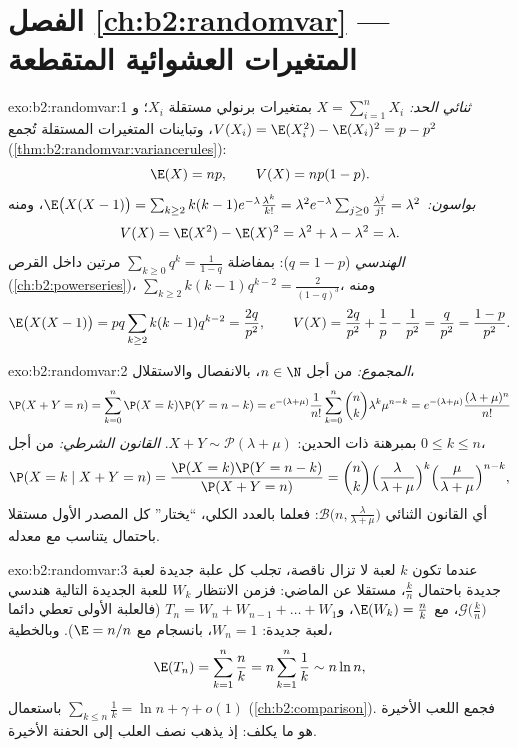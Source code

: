 \section*{الفصل \ref{ch:b2:randomvar} --- المتغيرات العشوائية المتقطعة}

\begin{solution}{exo:b2:randomvar:1}
\emph{ثنائي الحد:} $X = \sum_{i=1}^n X_i$ بمتغيرات برنولي مستقلة $X_i$؛ و$V(X_i) = \E(X_i^2) - \E(X_i)^2 = p - p^2$،
وتباينات المتغيرات المستقلة تُجمع (\cref{thm:b2:randomvar:variancerules}):
\[
\E(X) = np, \qquad V(X) = np(1-p) .
\]
\emph{بواسون:} $\E\bigl(X(X-1)\bigr) =
\sum_{k\geq2}k(k-1)e^{-\lambda}\frac{\lambda^k}{k!} = \lambda^2
e^{-\lambda}\sum_{j\geq0}\frac{\lambda^j}{j!} = \lambda^2$، ومنه
\[
V(X) = \E(X^2) - \E(X)^2
= \lambda^2 + \lambda - \lambda^2 = \lambda .
\]
\emph{الهندسي} ($q = 1 - p$): بمفاضلة $\sum_{k\geq0}q^k = \frac{1}{1-q}$ مرتين داخل القرص (\cref{ch:b2:powerseries})،
$\sum_{k\geq2}k(k-1)q^{k-2} =
\frac{2}{(1-q)^3}$، ومنه
\[
\E\bigl(X(X-1)\bigr) = pq\sum_{k\geq2}k(k-1)q^{k-2}
= \frac{2q}{p^2},
\qquad
V(X) = \frac{2q}{p^2} + \frac1p - \frac{1}{p^2}
= \frac{q}{p^2} = \frac{1-p}{p^2} .
\]
\end{solution}

\begin{solution}{exo:b2:randomvar:2}
\emph{المجموع:} من أجل $n \in \N$، بالانفصال والاستقلال،
\[
\P(X + Y = n)
= \sum_{k=0}^n \P(X = k)\P(Y = n - k)
= e^{-(\lambda + \mu)}\frac{1}{n!}
\sum_{k=0}^n \binom nk \lambda^k\mu^{n-k}
= e^{-(\lambda+\mu)}\frac{(\lambda + \mu)^n}{n!}
\]
بمبرهنة ذات الحدين: $X + Y \sim \mathcal{P}(\lambda + \mu)$.
\emph{القانون الشرطي:} من أجل $0 \leq k \leq n$،
\[
\P(X = k \mid X + Y = n)
= \frac{\P(X = k)\P(Y = n - k)}{\P(X + Y = n)}
= \binom nk
\Bigl(\frac{\lambda}{\lambda+\mu}\Bigr)^{k}
\Bigl(\frac{\mu}{\lambda+\mu}\Bigr)^{n-k} ,
\]
أي القانون الثنائي $\mathcal{B}\bigl(n,
\frac{\lambda}{\lambda+\mu}\bigr)$: فعلما بالعدد الكلي، ``يختار'' كل 
المصدر الأول مستقلا باحتمال يتناسب مع معدله.
\end{solution}

\begin{solution}{exo:b2:randomvar:3}
عندما تكون $k$ لعبة لا تزال ناقصة، تجلب كل علبة جديدة لعبة جديدة
باحتمال $\frac kn$، مستقلا عن الماضي: فزمن الانتظار $W_k$ للعبة الجديدة
التالية هندسي $\mathcal{G}\bigl(\frac kn\bigr)$، مع $\E(W_k) = \frac nk$، و$T_n = W_n + W_{n-1} + \dots + W_1$ (فالعلبة الأولى تعطي دائما
لعبة جديدة: $W_n = 1$، بانسجام مع $\E = n/n$). وبالخطية،
\[
\E(T_n) = \sum_{k=1}^n \frac nk = n\sum_{k=1}^n\frac1k
\sim n\ln n ,
\]
باستعمال $\sum_{k\leq n}\frac1k = \ln n + \gamma + o(1)$ (\cref{ch:b2:comparison}). فجمع اللعب الأخيرة هو ما يكلف: إذ يذهب نصف
العلب إلى الحفنة الأخيرة.
\end{solution}

